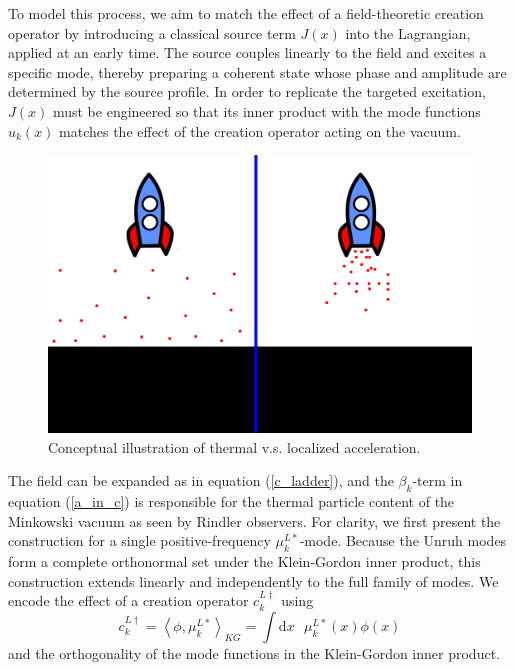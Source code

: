 \documentclass[12pt,a4paper]{article}
\newcommand{\dv}[1]{\mathrm{d} #1 \text{ }}
\begin{document}
To model this process, we aim to match the effect of a field-theoretic creation operator by introducing a classical source term $J(x)$ into the Lagrangian, applied at an early time. The source couples linearly to the field and excites a specific mode, thereby preparing a coherent state whose phase and amplitude are determined by the source profile. In order to replicate the targeted excitation, $J(x)$ must be engineered so that its inner product with the mode functions $u_k(x)$ matches the effect of the creation operator acting on the vacuum.

\begin{figure}[h]
\centering
\includegraphics[scale=0.5]{rocket_inertial.png}
\caption{Conceptual illustration of thermal v.s. localized acceleration.}
\label{rocket_inertial}
\end{figure}

The field can be expanded as in equation (\ref{c_ladder}), and the $\beta_k$-term in equation (\ref{a_in_c}) is responsible for the thermal particle content of the Minkowski vacuum as seen by Rindler observers. For clarity, we first present the construction for a single positive-frequency $\mu^{L*}_k$-mode. Because the Unruh modes form a complete orthonormal set under the Klein-Gordon inner product, this construction extends linearly and independently to the full family of modes. We encode the effect of a creation operator $c_k^{L \dagger}$ using
\begin{equation}
  c _k^{L\dagger} = \left<\phi, \mu_k^{L*}\right>_{KG} = \int \dv{x} \mu_k^{L*}(x) \phi(x)
\end{equation}
and the orthogonality of the mode functions in the Klein-Gordon inner product.
\end{document}

